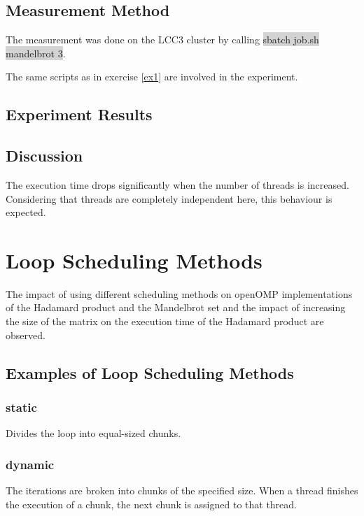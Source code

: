 \documentclass[parskip]{scrartcl}
\begin{document}
	\subsection{Measurement Method}
	The measurement was done on the LCC3 cluster by calling \colorbox{lightgray}{sbatch job.sh mandelbrot 3}.
	
	The same scripts as in exercise \ref{ex1} are involved in the experiment.
	
	\subsection{Experiment Results}
	
	\subsection{Discussion}
	The execution time drops significantly when the number of threads is increased. Considering that threads are completely independent here, this behaviour is expected.
	
	\section{Loop Scheduling Methods}
	The impact of using different scheduling methods on openOMP implementations of the Hadamard product and the Mandelbrot set and the impact of increasing the size of the matrix on the execution time of the Hadamard product are observed.
	
	\subsection{Examples of Loop Scheduling Methods}
	\subsubsection{static}
	Divides the loop into equal-sized chunks.
	\subsubsection{dynamic}
	The iterations are broken into chunks of the specified size. When a thread finishes the execution of a chunk, the next chunk is assigned to that thread.
\end{document}
